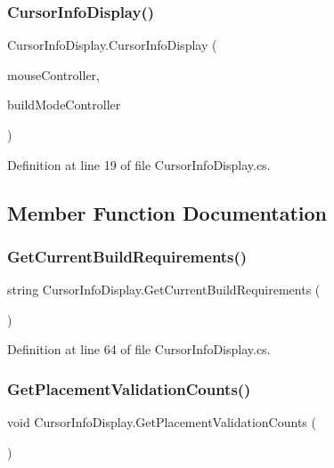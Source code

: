 \subsubsection{\texorpdfstring{Cursor\+Info\+Display()}{CursorInfoDisplay()}}
{\footnotesize\ttfamily Cursor\+Info\+Display.\+Cursor\+Info\+Display (\begin{DoxyParamCaption}\item[{\hyperlink{class_mouse_controller}{Mouse\+Controller}}]{mouse\+Controller,  }\item[{\hyperlink{class_build_mode_controller}{Build\+Mode\+Controller}}]{build\+Mode\+Controller }\end{DoxyParamCaption})}



Definition at line 19 of file Cursor\+Info\+Display.\+cs.



\subsection{Member Function Documentation}
\mbox{\label{class_cursor_info_display_a80998051ea382afb9512ccf5623a14e6}} 
\subsubsection{\texorpdfstring{Get\+Current\+Build\+Requirements()}{GetCurrentBuildRequirements()}}
{\footnotesize\ttfamily string Cursor\+Info\+Display.\+Get\+Current\+Build\+Requirements (\begin{DoxyParamCaption}{ }\end{DoxyParamCaption})}



Definition at line 64 of file Cursor\+Info\+Display.\+cs.

\mbox{\label{class_cursor_info_display_a79dddab21d35ca31728e8bf8b027a7f7}} 
\subsubsection{\texorpdfstring{Get\+Placement\+Validation\+Counts()}{GetPlacementValidationCounts()}}
{\footnotesize\ttfamily void Cursor\+Info\+Display.\+Get\+Placement\+Validation\+Counts (\begin{DoxyParamCaption}{ }\end{DoxyParamCaption})}



